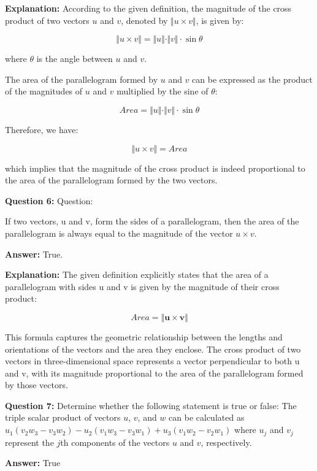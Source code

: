 \documentclass{article}
\begin{document}
\textbf{Explanation:} According to the given definition, the magnitude of the cross product of two vectors $u$ and $v$, denoted by $\Vert u \times v \Vert$, is given by:

$$\Vert u \times v \Vert = \Vert u \Vert \cdot \Vert v \Vert \cdot \sin \theta$$

where $\theta$ is the angle between $u$ and $v$.

The area of the parallelogram formed by $u$ and $v$ can be expressed as the product of the magnitudes of $u$ and $v$ multiplied by the sine of $\theta$:

$$Area = \Vert u \Vert \cdot \Vert v \Vert \cdot \sin \theta$$

Therefore, we have:

$$\Vert u \times v \Vert = Area$$

which implies that the magnitude of the cross product is indeed proportional to the area of the parallelogram formed by the two vectors.

\pagebreak 

    
\textbf {Question 6:} Question:

If two vectors, u and v, form the sides of a parallelogram, then the area of the parallelogram is always equal to the magnitude of the vector $u \times v$.

\textbf{Answer:} True.

\textbf{Explanation:} The given definition explicitly states that the area of a parallelogram with sides u and v is given by the magnitude of their cross product:

$$Area = \Vert \mathbf{u} \times \mathbf{v} \Vert$$

This formula captures the geometric relationship between the lengths and orientations of the vectors and the area they enclose. The cross product of two vectors in three-dimensional space represents a vector perpendicular to both u and v, with its magnitude proportional to the area of the parallelogram formed by those vectors.

\pagebreak 

    
\textbf {Question 7:}
Determine whether the following statement is true or false:
The triple scalar product of vectors \(u\), \(v\), and \(w\) can be calculated as 
\(u_1(v_2w_3 - v_3w_2) - u_2(v_1w_3 - v_3w_1) + u_3(v_1w_2 - v_2 w_1)\) 
where \(u_j\) and \(v_j\) represent the \(j\)th components of the vectors \(u\) and \(v\), respectively.


\textbf{Answer:} 
True
\end{document}
